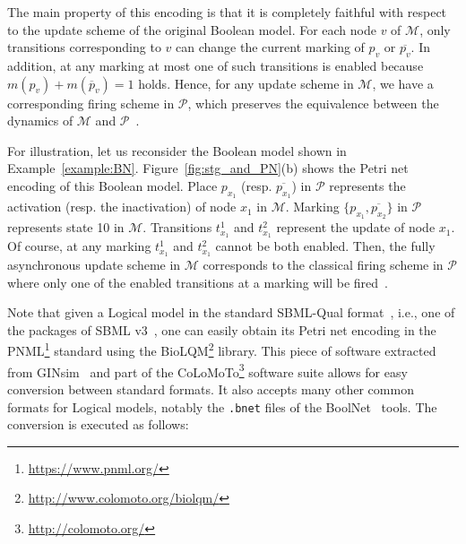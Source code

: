 \documentclass[runningheads]{llncs}
\begin{document}

The main property of this encoding is that it is completely faithful with respect to the update scheme of the original Boolean model.
For each node \(v\) of \(\mathcal{M}\), only transitions corresponding to \(v\) can change the current marking of \(p_v\) or \(\overline{p_v}\).
In addition, at any marking at most one of such transitions is enabled because \(m(p_v) + m(\overline{p}_v) = 1\) holds.
Hence, for any update scheme in \(\mathcal{M}\), we have a corresponding firing scheme in \(\mathcal{P}\), which preserves the equivalence between the dynamics of \(\mathcal{M}\) and \(\mathcal{P}\)~\cite{DBLP:journals/nc/ChatainHKPT20}.

For illustration, let us reconsider the Boolean model shown in Example~\ref{example:BN}.
Figure~\ref{fig:stg_and_PN}(b) shows the Petri net encoding of this Boolean model.
Place \(p_{x_1}\) (resp. \(\overline{p_{x_1}}\)) in \(\mathcal{P}\) represents the activation (resp. the inactivation) of node \(x_1\) in \(\mathcal{M}\).
Marking \(\{p_{x_1}, \overline{p_{x_2}}\}\) in \(\mathcal{P}\) represents state 10 in \(\mathcal{M}\). 
Transitions \(t^{1}_{x_1}\) and \(t^{2}_{x_1}\) represent the update of node \(x_1\).
Of course, at any marking \(t^{1}_{x_1}\) and \(t^{2}_{x_1}\) cannot be both enabled.
Then, the fully asynchronous update scheme in \(\mathcal{M}\) corresponds to the classical firing scheme in \(\mathcal{P}\) where only one of the enabled transitions at a marking will be fired~\cite{Murata1989}.

Note that given a Logical model in the standard SBML-Qual format~\cite{chaouiya2013sbml}, i.e., one of the packages of SBML v3~\cite{keating2020sbml}, one can easily obtain its Petri net encoding in the PNML\footnote{\url{https://www.pnml.org/}} standard using the BioLQM\footnote{\url{http://www.colomoto.org/biolqm/}} library.
This piece of software extracted from GINsim~\cite{chaouiya2012logical} and part of the CoLoMoTo\footnote{\url{http://colomoto.org/}} software suite allows for easy conversion between standard formats.
It also accepts many other common formats for Logical models, notably the \verb|.bnet| files of the  BoolNet~\cite{mussel2010boolnet,klarner2017pyboolnet} tools.
The conversion is executed as follows:

\end{document}
